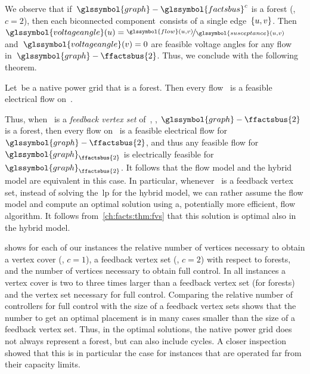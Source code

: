 We observe that if~$\glssymbol{graph} - \glssymbol{factsbus}^c$ is a forest
(\ie, $c = 2$), then each biconnected component~\subgraph consists of a single
edge~$\{ u, v
\}$. Then~$\glssymbol{voltageangle} (\vertexa) =
\nicefrac{\glssymbol{flow}(\vertexa,\vertexb)}{
\glssymbol{susceptance}(\vertexa,\vertexb)}$ and~$\glssymbol{voltageangle}
(\vertexb) = 0$ are feasible voltage angles for any flow~
in~$\glssymbol{graph} -
\ffactsbus{2}$. Thus, we conclude with the following theorem.
%
\begin{theorem}
    Let~\subgraph be a native power grid that is a forest. Then every
    flow~ is a feasible electrical flow on~\subgraph.
    \label{ch:facts:thm:fvs}
\end{theorem}
%
Thus, when~ is a \emph{feedback vertex set} of~, \ie,
$\glssymbol{graph}-\ffactsbus{2}$ is a forest, then every flow on~ is a feasible
electrical flow for~$\glssymbol{graph}-\ffactsbus{2}$, and thus any feasible flow
for~$\glssymbol{graph}_{\ffactsbus{2}}$ is electrically feasible for~$\glssymbol{graph}_{
\ffactsbus{2}}$. It follows that the flow model and the hybrid model are
equivalent in this case. In particular, whenever~ is a feedback vertex
set, instead of solving the~\gls{lp} for the hybrid model, we can rather
assume the flow model and compute an optimal solution using a, potentially more
efficient, flow algorithm.  It follows from~\cref{ch:facts:thm:fvs} that this
solution is optimal also in the hybrid model.

 shows for each of our instances
the relative number of vertices necessary to obtain a vertex cover (\ie, $c =
1$), a feedback vertex set (\ie, $c = 2$) with respect to forests, and the
number of vertices necessary to obtain full control.  In all instances a vertex
cover is two to three times larger than a feedback vertex set (for forests) and
the vertex set necessary for full control. Comparing the relative number of
controllers for full control with the size of a feedback vertex sets shows that
the number to get an optimal placement is in many cases smaller than the size of
a feedback vertex set. Thus, in the optimal solutions, the native power grid
does not always represent a forest, but can also include cycles. A closer
inspection showed that this is in particular the case for instances that are
operated far from their capacity limits.

